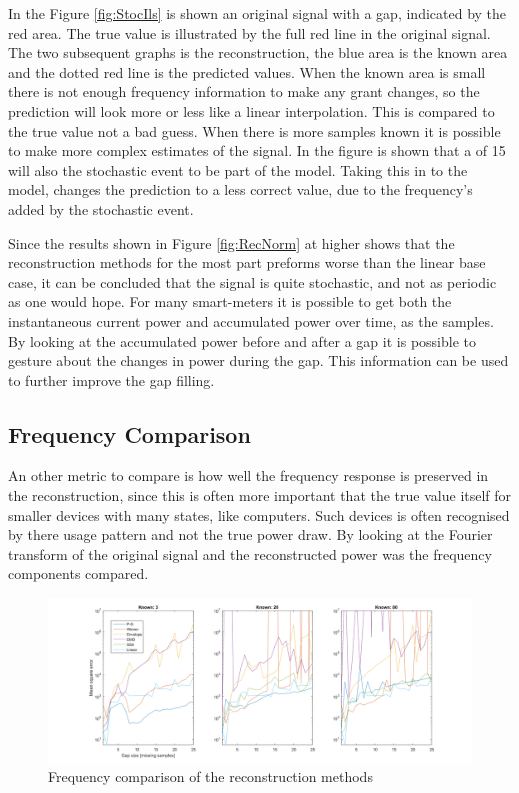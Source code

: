 In the Figure \ref{fig:StocIls} is shown an original signal with a gap, indicated by the red area. The true value is illustrated by the full red line in the original signal. The two subsequent graphs is the reconstruction, the blue area is the known area and the dotted red line is the predicted values. When the known area is small there is not enough frequency information to make any grant changes, so the prediction will look more or less like a linear interpolation. This is compared to the true value not a bad guess. When there is more samples known it is possible to make more complex estimates of the signal. In the figure is shown that a  of 15 will also the stochastic event to be part of the model. Taking this in to the model, changes the prediction to a less correct value, due to the frequency's added by the stochastic event. 

Since the results shown in Figure \ref{fig:RecNorm} at higher  shows that the reconstruction methods for the most part preforms worse than the linear base case, it can be concluded that the signal is quite stochastic, and not as periodic as one would hope. For many smart-meters it is possible to get both the instantaneous current power and accumulated power over time, as the samples. By looking at the accumulated power before and after a gap it is possible to gesture about the changes in power during the gap. This information can be used to further improve the gap filling. 

\newpage

\subsection{Frequency Comparison}
An other metric to compare is how well the frequency response is preserved in the reconstruction, since this is often more important that the true value itself for smaller devices with many states, like computers. Such devices is often recognised by there usage pattern and not the true power draw. By looking at the Fourier transform of the original signal and the reconstructed power was the frequency components compared. 

\begin{figure}[H]
\centering
\includegraphics[width=1\textwidth]{billeder/RecFeq.png}
\caption{Frequency comparison of the reconstruction methods}
\label{fig:RecFeq}
\end{figure}

